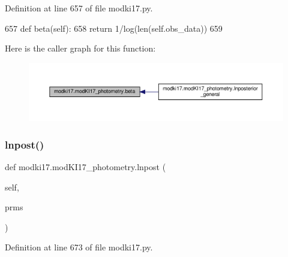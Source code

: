 Definition at line 657 of file modki17.\+py.


\begin{DoxyCode}
657     \textcolor{keyword}{def }beta(self):
658         \textcolor{keywordflow}{return} 1/log(len(self.obs\_data))
659         
\end{DoxyCode}
Here is the caller graph for this function\+:\nopagebreak
\begin{figure}[H]
\begin{center}
\leavevmode
\includegraphics[width=350pt]{dd/db2/classmodki17_1_1modKI17__photometry_a7038c9a4666ac8568838f51f9a4d9c21_icgraph}
\end{center}
\end{figure}
\mbox{\label{classmodki17_1_1modKI17__photometry_a9686c3f863cf13041edca94fbf62a157}} 
\subsubsection{\texorpdfstring{lnpost()}{lnpost()}}
{\footnotesize\ttfamily def modki17.\+mod\+K\+I17\+\_\+photometry.\+lnpost (\begin{DoxyParamCaption}\item[{}]{self,  }\item[{}]{prms }\end{DoxyParamCaption})}



Definition at line 673 of file modki17.\+py.


